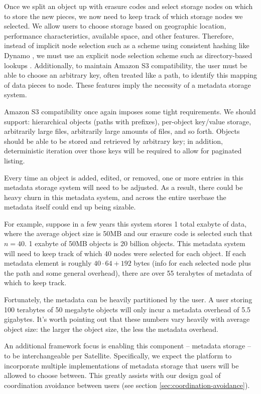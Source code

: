 \documentclass[8pt,fleqn,openany]{book}
\begin{document}
Once we split an object up with erasure codes and select storage nodes on
which to store the new pieces, we now need to keep track of which storage
nodes we selected. We allow users to choose storage based on geographic
location, performance characteristics, available space, and other features.
Therefore, instead of implicit node selection such as a scheme using consistent
hashing like Dynamo \cite{dynamo}, we must use an explicit node selection
scheme such as directory-based lookups \cite{p2p-policies}.
Additionally, to maintain Amazon S3 compatibility, the user must be able to
choose an arbitrary key, often treated like a path, to identify this mapping
of data pieces to node. These features imply the necessity of a metadata
storage system.

Amazon S3 compatibility once again imposes some tight requirements.
We should support:
hierarchical objects (paths with prefixes), per-object key/value storage,
arbitrarily large files, arbitrarily large amounts of files, and so forth.
Objects should be able to be stored and retrieved by arbitrary key; in addition,
deterministic iteration over those keys will be required to allow for
paginated listing.

Every time an
object is added, edited, or removed, one or more entries in this metadata
storage system will need to be adjusted. As a result, there could be heavy churn
in this metadata system, and across the entire userbase the metadata itself
could end up being sizable.

For example, suppose in
a few years this system stores 1 total exabyte of data, where the average object
size is 50MB and our erasure code is selected such that $n=40$.
1 exabyte of 50MB objects is 20 billion objects.
This metadata system will need
to keep track of which 40 nodes were selected for each object.
If each metadata element is roughly $40\cdot 64+192$ bytes (info for each
selected node plus the path and some general overhead), there are over 55
terabytes of metadata of which to keep track.

Fortunately, the metadata can be heavily partitioned by the user. A user storing
100 terabytes of 50 megabyte objects will only incur a metadata overhead of 5.5
gigabytes. It's worth pointing out that these numbers vary
heavily with average object size: the larger the object size, the less the
metadata overhead.

An additional framework focus is enabling this component -- metadata
storage -- to be interchangeable per Satellite. Specifically, we expect the platform to incorporate
multiple implementations of metadata storage that users will be allowed to
choose between. This greatly assists with our design goal of coordination
avoidance between users (see section \ref{sec:coordination-avoidance}).
\end{document}

